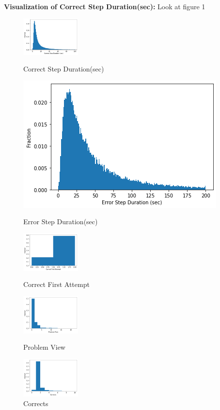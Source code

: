 \documentclass{article}
\begin{document}
\textbf{Visualization of Correct Step Duration(sec):} Look at figure 1\\
\begin{figure}[htbp]
  \begin{minipage}[c]{3cm}
    \centering
    \includegraphics[width=3cm]{correct_step_duration.png}
    \caption{Correct Step Duration(sec)}
  \end{minipage}
  \begin{minipage}[c]{3cm}
    \centering
    \includegraphics[width=3.cm]{error_step_duration.png}
    \caption{Error Step Duration(sec)}
  \end{minipage}
  \begin{minipage}[c]{3cm}
    \centering
    \includegraphics[width=3cm]{correct_first_attempt.png}
    \caption{Correct First Attempt}
  \end{minipage}
  \begin{minipage}[c]{3cm}
    \centering
    \includegraphics[width=3cm]{problem_view.png}
    \caption{Problem View}
  \end{minipage}
  \begin{minipage}[c]{3cm}
    \centering
    \includegraphics[width=3cm]{corrects.png}
    \caption{Corrects}
  \end{minipage}
  \begin{minipage}[c]{3cm}

\end{minipage}
\end{figure}
\end{document}
